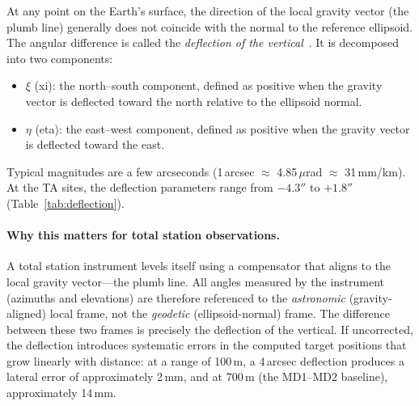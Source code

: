 At any point on the Earth's surface, the direction of the local gravity vector (the plumb line) generally does not coincide with the normal to the reference ellipsoid. The angular difference is called the \emph{deflection of the vertical}~\cite{torge2012}. It is decomposed into two components:
\begin{itemize}[nosep]
\item $\xi$ (xi): the north--south component, defined as positive when the gravity vector is deflected toward the north relative to the ellipsoid normal.
\item $\eta$ (eta): the east--west component, defined as positive when the gravity vector is deflected toward the east.
\end{itemize}
Typical magnitudes are a few arcseconds (1\,arcsec $\approx$ 4.85\,$\mu$rad $\approx$ 31\,mm/km). At the TA sites, the deflection parameters range from $-4.3''$ to $+1.8''$ (Table~\ref{tab:deflection}).

\paragraph{Why this matters for total station observations.} A total station instrument levels itself using a compensator that aligns to the local gravity vector---the plumb line. All angles measured by the instrument (azimuths and elevations) are therefore referenced to the \emph{astronomic} (gravity-aligned) local frame, not the \emph{geodetic} (ellipsoid-normal) frame. The difference between these two frames is precisely the deflection of the vertical. If uncorrected, the deflection introduces systematic errors in the computed target positions that grow linearly with distance: at a range of 100\,m, a 4\,arcsec deflection produces a lateral error of approximately 2\,mm, and at 700\,m (the MD1--MD2 baseline), approximately 14\,mm.

